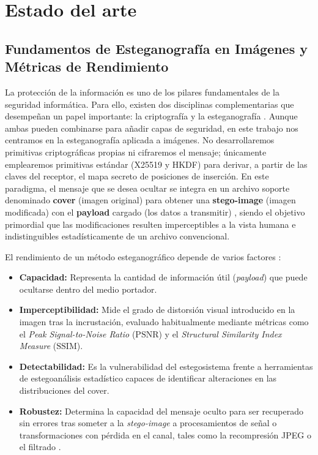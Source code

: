 \documentclass[IB]{TFUOC}%
\begin{document}
\chapter{Estado del arte}
\label{chap:estado_arte}

\section{Fundamentos de Esteganografía en Imágenes y Métricas de Rendimiento}

La protección de la información es uno de los pilares fundamentales de la seguridad informática. Para ello, existen dos disciplinas complementarias que desempeñan un papel importante: la criptografía y la esteganografía \cite{13}. Aunque ambas pueden combinarse para añadir capas de seguridad, en este trabajo nos centramos en la esteganografía aplicada a imágenes. No desarrollaremos primitivas criptográficas propias ni cifraremos el mensaje; únicamente emplearemos primitivas estándar (X25519 y HKDF) para derivar, a partir de las claves del receptor, el mapa secreto de posiciones de inserción. En este paradigma, el mensaje que se desea ocultar se integra en un archivo soporte denominado \textbf{cover} (imagen original) para obtener una \textbf{stego-image} (imagen modificada) con el \textbf{payload} cargado (los datos a transmitir) \cite{3}, siendo el objetivo primordial que las modificaciones resulten imperceptibles a la vista humana e indistinguibles estadísticamente de un archivo convencional.

El rendimiento de un método esteganográfico depende de varios factores \cite{11,3}:

\begin{itemize}
    \item \textbf{Capacidad:} Representa la cantidad de información útil (\textit{payload}) que puede ocultarse dentro del medio portador.
    \item \textbf{Imperceptibilidad:} Mide el grado de distorsión visual introducido en la imagen tras la incrustación, evaluado habitualmente mediante métricas como el \textit{Peak Signal-to-Noise Ratio} ($\mathrm{PSNR}$) y el \textit{Structural Similarity Index Measure} ($\mathrm{SSIM}$).
    \item \textbf{Detectabilidad:} Es la vulnerabilidad del estegosistema frente a herramientas de estegoanálisis estadístico capaces de identificar alteraciones en las distribuciones del cover.
    \item \textbf{Robustez:} Determina la capacidad del mensaje oculto para ser recuperado sin errores tras someter a la \textit{stego-image} a procesamientos de señal o transformaciones con pérdida en el canal, tales como la recompresión JPEG o el filtrado \cite{16}.
\end{itemize}
\end{document}
